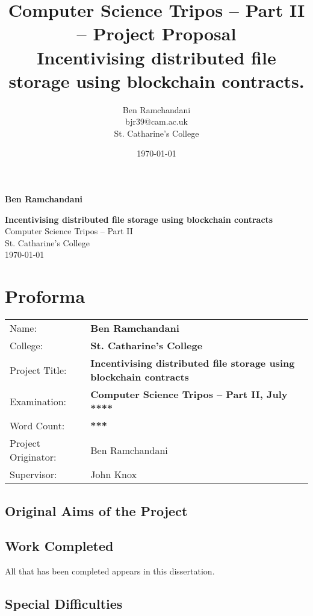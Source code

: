 \documentclass[12pt,a4paper,twoside,openright]{report}
\title{
{\Large Computer Science Tripos -- Part II -- Project Proposal}\\
\vspace{1em}
Incentivising distributed file storage using blockchain contracts.}
\author{Ben Ramchandani \\ bjr39@cam.ac.uk \\ St. Catharine's College}
\date{\today}
\begin{document}
\begin{titlepage}
\hfill \textbf{\Large Ben Ramchandani}
\vspace{10em}
\begin{center}
{\huge \bfseries Incentivising distributed file storage using blockchain contracts}\\
\vspace{2em}
{\Large Computer Science Tripos -- Part II}\\
\vspace{2em}
{\Large St. Catharine's College}\\
\vspace{2em}
{\Large \today}
\end{center}
\end{titlepage}

\chapter*{Proforma}

{
\begin{tabular}{ll}
Name:               & \bf Ben Ramchandani\\
College:            & \bf St. Catharine's College\\
Project Title:      & \bf Incentivising distributed file storage using blockchain contracts\\
Examination:        & \bf Computer Science Tripos -- Part II, July ****  \\
Word Count:         & \bf ****\footnotemark[1]\\
Project Originator: & Ben Ramchandani\\
Supervisor:         & John Knox\\ 
\end{tabular}
}

\section*{Original Aims of the Project}


\section*{Work Completed}

All that has been completed appears in this dissertation.

\section*{Special Difficulties}
\end{document}
